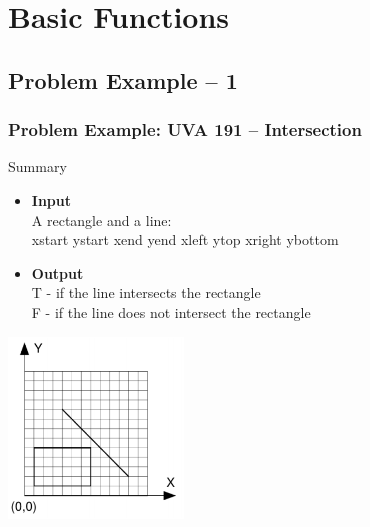 \section{Basic Functions}

\subsection{Problem Example -- 1}
\begin{frame}
  \frametitle{Problem Example: UVA 191 -- Intersection}

  {\small
    \begin{block}{Summary}
      \begin{itemize}
      \item {\bf Input}\\
        A rectangle and a line:\\
        xstart ystart xend yend xleft ytop xright ybottom

      \item {\bf Output}\\
        T - if the line intersects the rectangle\\
        F - if the line does not intersect the rectangle\\
      \end{itemize}
    \end{block}

    \includegraphics[width=0.35\textwidth]{img/intersection_uva}
    }
\end{frame}

